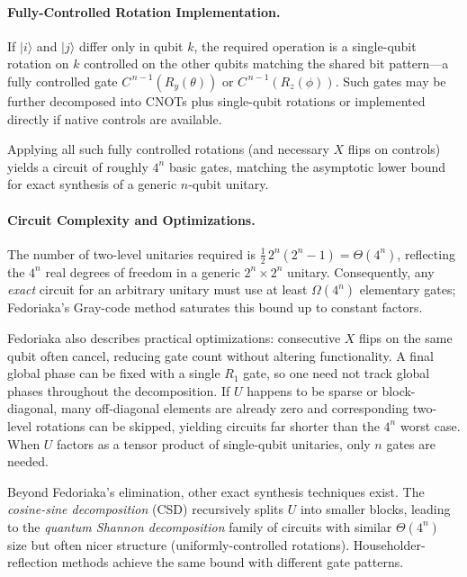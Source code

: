 \paragraph{Fully-Controlled Rotation Implementation.} 
If $|i\rangle$ and $|j\rangle$ differ only in qubit $k$, the required operation is a single-qubit rotation on $k$ controlled on the other qubits matching the shared bit pattern—a fully controlled gate $C^{\,n-1}(R_y(\theta))$ or $C^{\,n-1}(R_z(\phi))$.\cite{fedoriaka2025decomposition} Such gates may be further decomposed into CNOTs plus single-qubit rotations or implemented directly if native controls are available.\cite{Barenco1995elementary}

Applying all such fully controlled rotations (and necessary $X$ flips on controls) yields a circuit of roughly $4^{n}$ basic gates, matching the asymptotic lower bound for exact synthesis of a generic $n$-qubit unitary.\cite{Shende2006synthesis}

\paragraph{Circuit Complexity and Optimizations.} 
The number of two-level unitaries required is $\tfrac12\,2^{n}(2^{n}-1)=\Theta(4^{n})$, reflecting the $4^{n}$ real degrees of freedom in a generic $2^{n}\!\times\!2^{n}$ unitary.\cite{Shende2006synthesis} Consequently, any \emph{exact} circuit for an arbitrary unitary must use at least $\Omega(4^{n})$ elementary gates; Fedoriaka's Gray-code method saturates this bound up to constant factors.\cite{fedoriaka2025decomposition}

Fedoriaka also describes practical optimizations: consecutive $X$ flips on the same qubit often cancel, reducing gate count without altering functionality.\cite{fedoriaka2025decomposition} A final global phase can be fixed with a single $R_1$ gate, so one need not track global phases throughout the decomposition.\cite{Reck1994optics} 
If $U$ happens to be sparse or block-diagonal, many off-diagonal elements are already zero and corresponding two-level rotations can be skipped, yielding circuits far shorter than the $4^{n}$ worst case.\cite{Bullock2004gray} When $U$ factors as a tensor product of single-qubit unitaries, only $n$ gates are needed.\cite{Barenco1995elementary}

Beyond Fedoriaka's elimination, other exact synthesis techniques exist. The \emph{cosine-sine decomposition} (CSD) recursively splits $U$ into smaller blocks, leading to the \emph{quantum Shannon decomposition} family of circuits with similar $\Theta(4^{n})$ size but often nicer structure (uniformly-controlled rotations).\cite{Miller2006csd} Householder-reflection methods achieve the same bound with different gate patterns.\cite{Shende2006synthesis}


